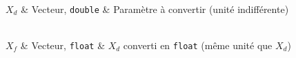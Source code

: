 \begin{tabarg}
\\
\hline
$X_d$ & Vecteur, \texttt{double} & Param\`etre \`a convertir (unit\'e indiff\'erente)\\
\end{tabarg}

\medskip
\begin{tabarg}
\\
\hline
$X_f$ & Vecteur, \texttt{float} & $X_d$ converti en \texttt{float} (m\^eme unit\'e que $X_d$)\\
\end{tabarg}
